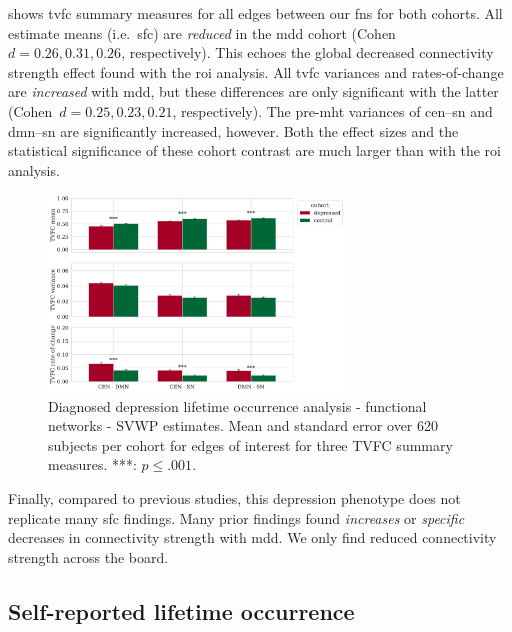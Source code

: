 shows \gls{tvfc} summary measures for all edges between our \glspl{fn} for both cohorts.
%
All estimate means (i.e.~\gls{sfc}) are \emph{reduced} in the \gls{mdd} cohort (Cohen~$d = 0.26, 0.31, 0.26$, respectively).
This echoes the global decreased connectivity strength effect found with the \gls{roi} analysis.
%
All \gls{tvfc} variances and rates-of-change are \emph{increased} with \gls{mdd}, but these differences are only significant with the latter (Cohen~$d = 0.25, 0.23, 0.21$, respectively).
The pre-\gls{mht} variances of \gls{cen}--\gls{sn} and \gls{dmn}--\gls{sn} are significantly increased, however.
Both the effect sizes and the statistical significance of these cohort contrast are much larger than with the \gls{roi} analysis.


\begin{figure}[ht]
  \centering
  \includegraphics[width=0.7\textwidth]{fig/ukbiobank/TVFC_predictions_summaries/diagnosed_lifetime_occurrence/cohort_comparison/FN/correlation_all_TVFC_summary_measures_SVWP_joint_edges_of_interest}
  \caption{
    Diagnosed depression lifetime occurrence analysis - functional networks - SVWP estimates.
    Mean and standard error over 620 subjects per cohort for edges of interest for three TVFC summary measures.
    ***: $p \leq .001$.
  }\label{fig:ukb-results-dlo-fn-cohort-comparison-edges-of-interest-wp}
\end{figure}


Finally, compared to previous studies, this depression phenotype does not replicate many \gls{sfc} findings.
Many prior findings found \emph{increases} or \emph{specific} decreases in connectivity strength with \gls{mdd}.
We only find reduced connectivity strength across the board.

\clearpage
\subsection{Self-reported lifetime occurrence}

